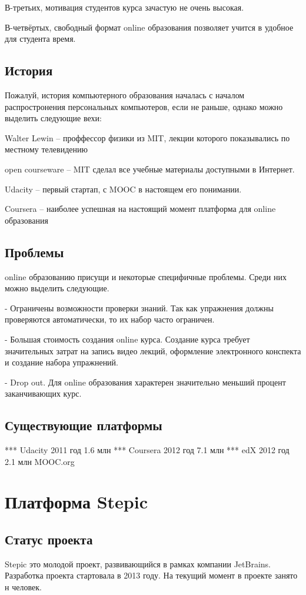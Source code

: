 \documentclass{matmex-diploma-custom}
\begin{document}
В-третьих, мотивация студентов курса зачастую не очень высокая.

В-четвёртых, свободный формат online образования позволяет учится в
удобное для студента время.

\subsection*{История}
Пожалуй, история компьютерного образования началась с началом
распростронения персональных компьютеров, если не раньше, однако можно
выделить следующие вехи:

Walter Lewin -- проффессор физики из MIT, лекции которого показывались
по местному телевидению

open courseware -- MIT сделал все учебные материалы доступными в Интернет.

Udacity -- первый стартап, с MOOC в настоящем его понимании.

Coursera -- наиболее успешная на настоящий момент платформа для online
образования

\subsection*{Проблемы}
online образованию присущи и некоторые специфичные проблемы. Среди них
можно выделить следующие.

- Ограничены возможности проверки знаний.
  Так как упражнения должны проверяются автоматически, то их набор часто
  ограничен.

- Большая стоимость создания online курса.  Создание курса требует
  значительных затрат на запись видео лекций, оформление
  электронного конспекта и создание набора упражнений.

- Drop out. Для online образования характерен значительно меньший
  процент заканчивающих курс.

\subsection*{Существующие платформы}
*** Udacity
   2011 год
   1.6 млн
*** Coursera
   2012 год
   7.1 млн
*** edX
   2012 год
   2.1 млн
   MOOC.org

\section{Платформа Stepic}

\subsection*{Статус проекта}
Stepic это молодой проект, развивающийся в рамках компании
JetBrains. Разработка проекта стартовала в 2013 году. На текущий
момент в проекте занято н человек.
\end{document}
